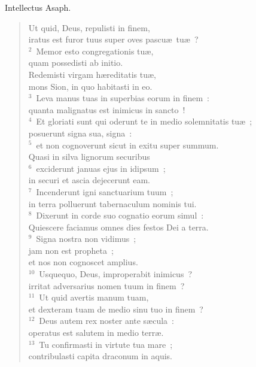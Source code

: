 \lettrine[lines=3,image=true,loversize=0.05,lraise=-0.03]{I}{}ntellectus Asaph. \begin{flushleft}\begin{verse}\vspace{6pt}Ut quid, Deus, repulisti in finem,\\ iratus est furor tuus super oves pascu\ae\ tu\ae~?\\
${}^{2}$~Memor esto congregationis tu\ae ,\\ quam possedisti ab initio.\\ Redemisti virgam h\ae reditatis tu\ae ,\\ mons Sion, in quo habitasti in eo.\\
${}^{3}$~Leva manus tuas in superbias eorum in finem~:\\ quanta malignatus est inimicus in sancto~!\\
${}^{4}$~Et gloriati sunt qui oderunt te in medio solemnitatis tu\ae~;\\ posuerunt signa sua, signa~:\\
${}^{5}$~et non cognoverunt sicut in exitu super summum.\\ Quasi in silva lignorum securibus\\
${}^{6}$~exciderunt januas ejus in idipsum~;\\ in securi et ascia dejecerunt eam.\\
${}^{7}$~Incenderunt igni sanctuarium tuum~;\\ in terra polluerunt tabernaculum nominis tui.\\
${}^{8}$~Dixerunt in corde suo cognatio eorum simul~:\\ Quiescere faciamus omnes dies festos Dei a terra.\\
${}^{9}$~Signa nostra non vidimus~;\\ jam non est propheta~;\\ et nos non cognoscet amplius.\\
${}^{10}$~Usquequo, Deus, improperabit inimicus~?\\ irritat adversarius nomen tuum in finem~?\\
${}^{11}$~Ut quid avertis manum tuam,\\ et dexteram tuam de medio sinu tuo in finem~?\\
${}^{12}$~Deus autem rex noster ante s\ae cula~:\\ operatus est salutem in medio terr\ae .\\
${}^{13}$~Tu confirmasti in virtute tua mare~;\\ contribulasti capita draconum in aquis.\\

\end{verse}
\end{flushleft}
